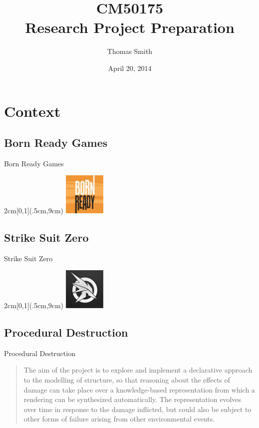 \documentclass[t]{beamer}
\author[T.A.E.Smith]{Thomas Smith}
\title[CM50175]{CM50175\\Research Project Preparation}
\institute[Bath/CS]{Centre for Digital Entertainment\\University of Bath}
\date{April 20, 2014}
\begin{document}

\begin{frame}
	\titlepage
\end{frame}

\section{Context}
	\subsection{Born Ready Games}
		\begin{frame}{Born Ready Games}
		\begin{textblock*}{2cm}[0,1](.5cm,9cm) %
		\includegraphics[width=2cm]{bornready.jpg}
		\end{textblock*}


		\end{frame}
	\subsection{Strike Suit Zero}
		\begin{frame}{Strike Suit Zero}
		\begin{textblock*}{2cm}[0,1](.5cm,9cm) %
		\includegraphics[width=2cm]{strikesuitzero.jpg}
		\end{textblock*}


		\end{frame}
	\subsection{Procedural Destruction}
		\begin{frame}{Procedural Destruction}

		\begin{quote}
		The aim of the project is to explore and implement a declarative approach to the modelling of structure, so that reasoning about the effects of damage can take place over a knowledge-based representation from which a rendering can be synthesized automatically.  The representation evolves over time in response to the damage inflicted, but could also be subject to other forms of failure arising from other environmental events.
		\end{quote}

		\end{frame}
\end{document}
